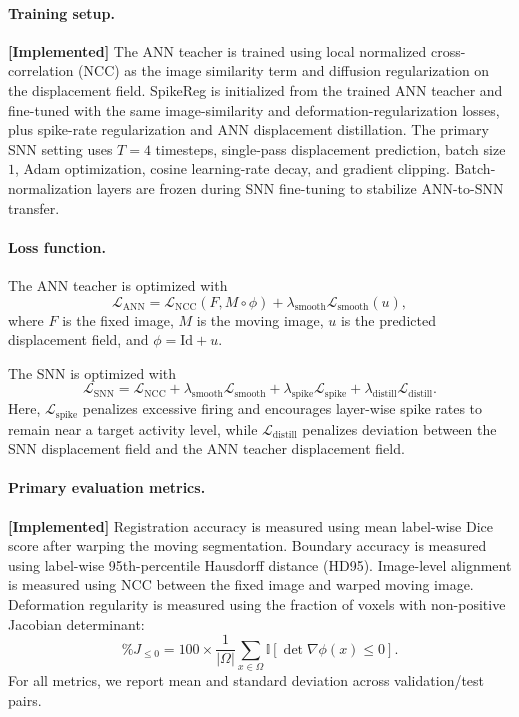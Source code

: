\paragraph{Training setup.}
\textbf{[Implemented]} The ANN teacher is trained using local normalized cross-correlation (NCC) as the image similarity term and diffusion regularization on the displacement field. SpikeReg is initialized from the trained ANN teacher and fine-tuned with the same image-similarity and deformation-regularization losses, plus spike-rate regularization and ANN displacement distillation. The primary SNN setting uses \(T=4\) timesteps, single-pass displacement prediction, batch size \(1\), Adam optimization, cosine learning-rate decay, and gradient clipping. Batch-normalization layers are frozen during SNN fine-tuning to stabilize ANN-to-SNN transfer.

\paragraph{Loss function.}
The ANN teacher is optimized with
\begin{equation}
\mathcal{L}_{\mathrm{ANN}}
=
\mathcal{L}_{\mathrm{NCC}}(F, M \circ \phi)
+
\lambda_{\mathrm{smooth}}\mathcal{L}_{\mathrm{smooth}}(u),
\end{equation}
where \(F\) is the fixed image, \(M\) is the moving image, \(u\) is the predicted displacement field, and \(\phi = \mathrm{Id} + u\).

The SNN is optimized with
\begin{equation}
\mathcal{L}_{\mathrm{SNN}}
=
\mathcal{L}_{\mathrm{NCC}}
+
\lambda_{\mathrm{smooth}}\mathcal{L}_{\mathrm{smooth}}
+
\lambda_{\mathrm{spike}}\mathcal{L}_{\mathrm{spike}}
+
\lambda_{\mathrm{distill}}\mathcal{L}_{\mathrm{distill}}.
\end{equation}
Here, \(\mathcal{L}_{\mathrm{spike}}\) penalizes excessive firing and encourages layer-wise spike rates to remain near a target activity level, while \(\mathcal{L}_{\mathrm{distill}}\) penalizes deviation between the SNN displacement field and the ANN teacher displacement field.

\paragraph{Primary evaluation metrics.}
\textbf{[Implemented]} Registration accuracy is measured using mean label-wise Dice score after warping the moving segmentation. Boundary accuracy is measured using label-wise 95th-percentile Hausdorff distance (HD95). Image-level alignment is measured using NCC between the fixed image and warped moving image. Deformation regularity is measured using the fraction of voxels with non-positive Jacobian determinant:
\begin{equation}
\%J_{\leq 0}
=
100 \times
\frac{1}{|\Omega|}
\sum_{x \in \Omega}
\mathbb{I}
\left[
\det \nabla \phi(x) \leq 0
\right].
\end{equation}
For all metrics, we report mean and standard deviation across validation/test pairs.

